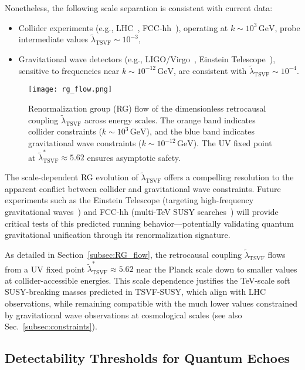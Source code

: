 \documentclass[twocolumn,superscriptaddress,floatfix]{revtex4-2}
\begin{document}
Nonetheless, the following scale separation is consistent with current data:
\begin{itemize}
    \item Collider experiments (e.g., LHC~\cite{Aad2015}, FCC-hh~\cite{FCC2019}), operating at \(k \sim 10^3\, \mathrm{GeV}\), probe intermediate values \(\tilde{\lambda}_{\text{TSVF}} \sim 10^{-3}\),
    \item Gravitational wave detectors (e.g., LIGO/Virgo~\cite{LIGO2016}, Einstein Telescope~\cite{Punturo2010}), sensitive to frequencies near \(k \sim 10^{-12}\, \mathrm{GeV}\), are consistent with \(\tilde{\lambda}_{\text{TSVF}} \sim 10^{-4}\).
\end{itemize}

\begin{figure}[htbp]
    \centering
    \texttt{[image: rg\_flow.png]}
    \caption{Renormalization group (RG) flow of the dimensionless retrocausal coupling \(\tilde{\lambda}_{\text{TSVF}}\) across energy scales. The orange band indicates collider constraints (\(k \sim 10^3\, \mathrm{GeV}\)), and the blue band indicates gravitational wave constraints (\(k \sim 10^{-12}\, \mathrm{GeV}\)). The UV fixed point at \(\tilde{\lambda}_{\text{TSVF}}^* \approx 5.62\) ensures asymptotic safety.}
    \label{fig:rg_flow}
\end{figure}

The scale-dependent RG evolution of \(\tilde{\lambda}_{\text{TSVF}}\) offers a compelling resolution to the apparent conflict between collider and gravitational wave constraints. Future experiments such as the Einstein Telescope (targeting high-frequency gravitational waves~\cite{Punturo2010}) and FCC-hh (multi-TeV SUSY searches~\cite{FCC2019}) will provide critical tests of this predicted running behavior—potentially validating quantum gravitational unification through its renormalization signature.

As detailed in Section~\ref{subsec:RG_flow}, the retrocausal coupling \(\tilde{\lambda}_{\text{TSVF}}\) flows from a UV fixed point \(\tilde{\lambda}_{\text{TSVF}}^* \approx 5.62\) near the Planck scale down to smaller values at collider-accessible energies. This scale dependence justifies the TeV-scale soft SUSY-breaking masses predicted in TSVF-SUSY, which align with LHC observations, while remaining compatible with the much lower values constrained by gravitational wave observations at cosmological scales (see also Sec.~\ref{subsec:constraints}).

\subsection{Detectability Thresholds for Quantum Echoes}  
\label{subsec:echo_detectability}  
\end{document}
